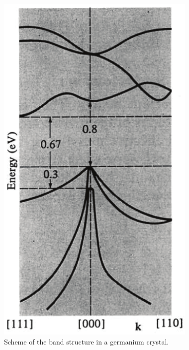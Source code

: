 \begin{figure}
\centering
\includegraphics[height=0.5\textheight]{Figures/Electrodes/band_structure.pdf}
\caption{Scheme of the band structure in a germanium crystal.}
\label{fig:band-structure}
\end{figure}

